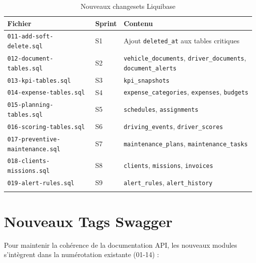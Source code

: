 \documentclass[12pt,a4paper]{report}
\begin{document}
\begin{longtable}{p{4.5cm}p{2cm}p{6.5cm}}
\toprule
\textbf{Fichier} & \textbf{Sprint} & \textbf{Contenu} \\
\midrule
\endhead
\texttt{011-add-soft-delete.sql} & S1 & Ajout \texttt{deleted\_at} aux tables critiques \\
\texttt{012-document-tables.sql} & S2 & \texttt{vehicle\_documents}, \texttt{driver\_documents}, \texttt{document\_alerts} \\
\texttt{013-kpi-tables.sql} & S3 & \texttt{kpi\_snapshots} \\
\texttt{014-expense-tables.sql} & S4 & \texttt{expense\_categories}, \texttt{expenses}, \texttt{budgets} \\
\texttt{015-planning-tables.sql} & S5 & \texttt{schedules}, \texttt{assignments} \\
\texttt{016-scoring-tables.sql} & S6 & \texttt{driving\_events}, \texttt{driver\_scores} \\
\texttt{017-preventive-maintenance.sql} & S7 & \texttt{maintenance\_plans}, \texttt{maintenance\_tasks} \\
\texttt{018-clients-missions.sql} & S8 & \texttt{clients}, \texttt{missions}, \texttt{invoices} \\
\texttt{019-alert-rules.sql} & S9 & \texttt{alert\_rules}, \texttt{alert\_history} \\
\bottomrule
\caption{Nouveaux changesets Liquibase}
\end{longtable}

\section{Nouveaux Tags Swagger}

Pour maintenir la cohérence de la documentation API, les nouveaux modules s'intègrent dans la numérotation existante (01-14) :
\end{document}
